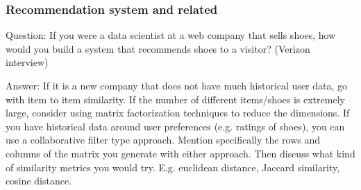 \documentclass[11pt]{beamer}
\begin{document}
\begin{frame}
\frametitle{Recommendation system and related}
\begin{block}{Question:}
	If you were a data scientist at a web company that sells shoes, how would you build a system that recommends shoes to a visitor? (Verizon interview)
\end{block}
\begin{block}{Answer:}
	If it is a new company that does not have much historical user data, go with item­ to item similarity. If the number of different items/shoes is extremely large, consider using matrix factorization techniques to reduce the dimensions.
	If you have historical data around user preferences (e.g. ratings of shoes), you can use a collaborative filter type approach. Mention specifically the rows and columns of the matrix you generate with either approach. Then discuss what kind of similarity metrics you would try. E.g. euclidean distance, Jaccard similarity, cosine distance.
\end{block}
\end{frame}
\end{document}
